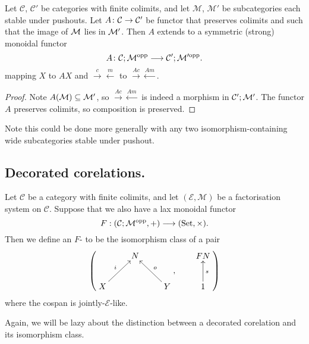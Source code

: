\begin{lemma}
  Let $\mathcal C$, $\mathcal C'$ be categories with finite colimits, and let
  $\mathcal M$, $\mathcal M'$ be subcategories each stable under pushouts. Let
  $A{\colon} \mathcal C \to \mathcal C'$ be functor that preserves colimits and such
  that the image of $\mathcal M$ lies in $\mathcal M'$. Then $A$ extends to a symmetric
  (strong) monoidal functor
  \[
    A{\colon} \mathcal C;\mathcal M^{\mathrm{opp}} \longrightarrow \mathcal C'; \mathcal M'^{\mathrm{opp}}.
  \]
  mapping $X$ to $AX$ and $\stackrel{c}\rightarrow \stackrel{m}\leftarrow$ to
  $\stackrel{Ac}\rightarrow \stackrel{Am}\leftarrow$.
\end{lemma}
\begin{proof}
  Note $A(\mathcal M) \subseteq \mathcal M'$, so $\stackrel{Ac}\rightarrow
  \stackrel{Am}\leftarrow$ is indeed a morphism in $\mathcal C';\mathcal M'$. The functor
  $A$ preserves colimits, so composition is preserved.
\end{proof}

Note this could be done more generally with any two isomorphism-containing wide
subcategories stable under pushout.

\subsection{Decorated corelations.}

\begin{definition}
  Let $\mathcal C$ be a category with finite colimits, and let $(\mathcal E,
  \mathcal M)$ be a factorisation system on $\mathcal C$. Suppose that we also
  have a lax monoidal functor
  \[
    F: (\mathcal C;\mathcal M^{\mathrm{opp}},+) \longrightarrow (\mathrm{Set}, \times).
  \]
  Then we define an $F$- to be the isomorphism
  class of a pair
  \[
    \left(
    \begin{aligned}
      \xymatrix{
	& N \\  
	X \ar[ur]^{i} && Y \ar[ul]_{o}
      }
    \end{aligned}
    ,
    \qquad
    \begin{aligned}
      \xymatrix{
	FN \\
	1 \ar[u]_{s}
      }
    \end{aligned}
    \right)
  \]
  where the cospan is jointly-$\mathcal E$-like.
\end{definition}

Again, we will be lazy about the distinction between a decorated corelation and
its isomorphism class.

